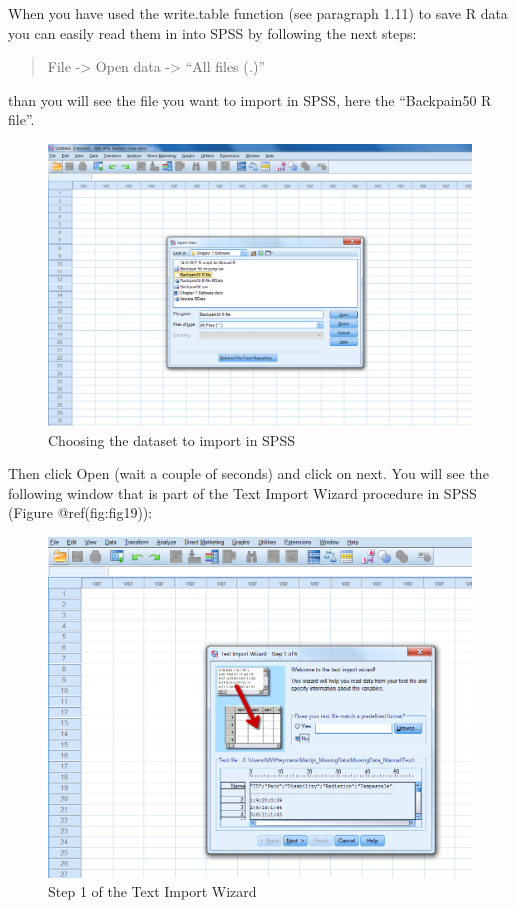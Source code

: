 \documentclass[
]{book}
\begin{document}
When you have used the write.table function (see paragraph 1.11) to save
R data you can easily read them in into SPSS by following the next
steps:

\begin{quote}
File -\textgreater{} Open data -\textgreater{} ``All files (\emph{.})''
\end{quote}

than you will see the file you want to import in SPSS, here the
``Backpain50 R file''.

\begin{figure}

{\centering \includegraphics[width=0.95\linewidth]{images/fig1.18} 

}

\caption{Choosing the dataset to import in SPSS}\label{fig:fig18}
\end{figure}

Then click Open (wait a couple of seconds) and click on next. You will
see the following window that is part of the Text Import Wizard
procedure in SPSS (Figure @ref(fig:fig19)):

\begin{figure}

{\centering \includegraphics[width=0.95\linewidth]{images/fig1.19} 

}

\caption{Step 1 of the Text Import Wizard}\label{fig:fig19}
\end{figure}
\end{document}
